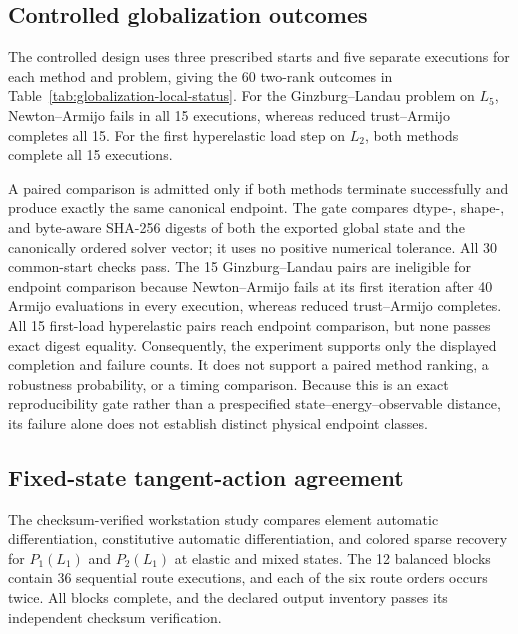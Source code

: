 \subsection{Controlled globalization outcomes}
\label{subsec:globalization-results}

The controlled design uses three prescribed starts and five separate
executions for each method and problem, giving the 60 two-rank
outcomes in Table~\ref{tab:globalization-local-status}. For the
Ginzburg--Landau problem on $L_5$, Newton--Armijo fails in all 15 executions, whereas
reduced trust--Armijo completes all 15. For the first hyperelastic load step on
$L_2$, both methods complete all 15 executions.

{

}

A paired comparison is admitted only if both methods terminate successfully
and produce exactly the same canonical endpoint. The gate compares dtype-,
shape-, and byte-aware SHA-256 digests of both the exported global state and the
canonically ordered solver vector; it uses no positive numerical tolerance.
All 30 common-start checks pass. The 15 Ginzburg--Landau pairs are ineligible
for endpoint comparison because Newton--Armijo fails at its first iteration
after 40 Armijo evaluations in every execution, whereas reduced trust--Armijo
completes. All 15 first-load hyperelastic pairs reach endpoint comparison, but
none passes exact digest equality.
Consequently, the experiment supports only the displayed completion and
failure counts. It does not support a paired method ranking, a robustness
probability, or a timing comparison. Because this is an exact reproducibility
gate rather than a prespecified state--energy--observable distance, its failure
alone does not establish distinct physical endpoint classes.

\subsection{Fixed-state tangent-action agreement}
\label{subsec:route-map-results}

The checksum-verified workstation study compares element automatic differentiation,
constitutive automatic differentiation, and colored sparse recovery for
$P_1(L_1)$ and $P_2(L_1)$ at elastic and mixed states. The 12 balanced blocks
contain 36 sequential route executions, and each of the six route orders occurs
twice. All blocks complete, and the declared output inventory passes its
independent checksum verification.

